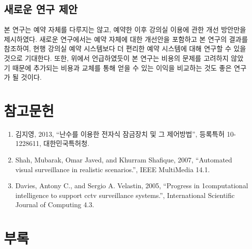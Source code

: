\documentclass[11pt,a4paper]{article}
\begin{document}
\subsection{새로운 연구 제안}
본 연구는 예약 자체를 다루지는 않고, 예약한 이후 강의실 이용에 관한 개선
방안만을 제시하였다. 새로운 연구에서는 예약 자체에 대한 개선안을 포함하고 본
연구의 결과를 참조하여, 현행 강의실 예약 시스템보다 더 편리한 예약 시스템에
대해 연구할 수 있을 것으로 기대한다.
또한, 위에서 언급하였듯이 본 연구는 비용의 문제를 고려하지 않았기 때문에
추가되는 비용과 교체를 통해 얻을 수 있는 이익을 비교하는 것도 좋은 연구가 될
것이다.

\section{참고문헌}
\begin{enumerate}
\item 김지영, 2013, “난수를 이용한 전자식 잠금장치 및 그 제어방법”, 등록특허 10-1228611, 대한민국특허청.
\item Shah, Mubarak, Omar Javed, and Khurram Shafique, 2007, “Automated visual surveillance in realistic scenarios.”, IEEE MultiMedia 14.1.
\item Davies, Antony C., and Sergio A. Velastin, 2005, “Progress in 1computational intelligence to support cctv surveillance systems.”, International Scientific Journal of Computing 4.3.
\end{enumerate}

\section{부록}
\end{document}
